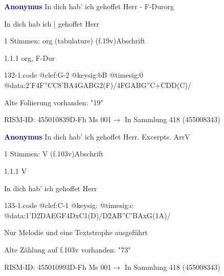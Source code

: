 \documentclass[twocolumn]{book}
\begin{document}
\par \vspace{7pt} \textcolor{darkblue}{\textbf{Anonymus  }}\hfillplus{\textbf{[132]}}\newline In dich hab' ich gehoffet Herr - F-Dur\newline org
\par \begin{itshape}[f.19v, at left:] In dich hab ich | gehoffet Herr\end{itshape} 
\par \textcolor{darkblue}{}  1 Stimmen: org (tabulature)  (f.19v)\newline Abschrift
\par 1.1.1  org, F-Dur  
\begin{filecontents*}{132-1.code}
@clef:G-2
@keysig:bB
@timesig:0
@data:2'F4F''CC{8'BA}4GABG2(F)/4FGABG''C+CDD(C)/
\end{filecontents*}
\newline
%
\par Alte Foliierung vorhanden: "19"
\par RISM-ID: 455010839\newline D-Fh  Ms 001\newline $\rightarrow$ In Sammlung 418 (455008343)
      
\par \vspace{7pt} \textcolor{darkblue}{\textbf{Anonymus  }}\hfillplus{\textbf{[133]}}\newline In dich hab' ich gehoffet Herr. Excerpts. Arr\newline V
\par \begin{itshape}\end{itshape} 
\par \textcolor{darkblue}{}  1 Stimmen: V  (f.103v)\newline Abschrift
\par 1.1.1  V\newline \begin{footnotesize} In dich hab' ich gehoffet Herr \end{footnotesize}  
\begin{filecontents*}{133-1.code}
@clef:C-1
@keysig:
@timesig:c
@data:1'D2DAEGF4DxC1(D)/D2AB''C'BAxG(1A)/
\end{filecontents*}
\newline
%
\par Nur Melodie und eine Textstrophe ausgeführt
\par Alte Zählung auf f.103v vorhanden: "73"
\par RISM-ID: 455010993\newline D-Fh  Ms 001\newline $\rightarrow$ In Sammlung 418 (455008343)
      
\end{document}
